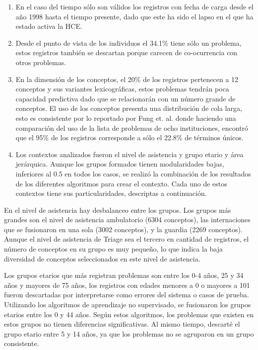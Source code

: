 \begin{enumerate}
\item En el caso del tiempo sólo son válidos los registros con fecha de carga desde el año 1998 hasta el tiempo presente, dado que este ha sido el lapso en el que ha estado activa la \acrshort{HCE}.
\item Desde el punto de vista de los individuos  el 34.1\% tiene sólo un problema, estos registros también se descartan porque carecen de co-ocurrencia con otros problemas.
\item En la dimensión de los conceptos, el 20\% de los registros pertenecen a 12 conceptos y sus variantes lexicográficas, estos problemas tendrán poca capacidad predictiva dado que se relacionarán con un número grande de conceptos. El uso de los conceptos presenta una distribución de cola larga, esto es consistente por lo reportado por Fung et. al.\cite{Fung2015AnCT} donde haciendo una comparación del uso de la lista de problemas de ocho instituciones, encontró que el 95\% de los registros corresponde a sólo el 22.8\% de términos únicos.
\item Los contextos analizados fueron el  nivel de asistencia y grupo etario y área jerárquica. Aunque los grupos formados tienen modularidades bajas, inferiores al \num{0.5} en todos los casos, se realizó la combinación de los resultados de los diferentes algoritmos para crear el contexto.  Cada uno de estos contextos tiene sus particularidades, descriptas a continuación.
\end{enumerate}

En el nivel de asistencia hay desbalanceo entre los grupos. Los grupos más grandes son el nivel de asistencia ambulatorio (\num{6304} conceptos), las internaciones que se fusionaron en una sola (\num{3002} conceptos), y la guardia (\num{2269} conceptos). Aunque el nivel de asistencia de Triage sea el tercero en cantidad de registros, el número de conceptos en su grupo es muy pequeño, lo que indica la baja diversidad de conceptos seleccionados en este nivel de asistencia. 

Los grupos etarios que más registran problemas son entre los 0-4 años, 25 y 34 años y mayores de 75 años, los registros con edades menores a 0 o mayores a 101 fueron descartadas por interpretarse como errores del sistema o casos de prueba. Utilizando los algoritmos de aprendizaje no supervisado, se fusionaron los grupos etarios entre los 0 y 44 años. Según estos algoritmos, los problemas que existen en estos grupos no tienen diferencias significativas. Al mismo tiempo, descarté el grupo etario entre 5 y 14 años, ya que los problemas no se agruparon en un grupo consistente.

